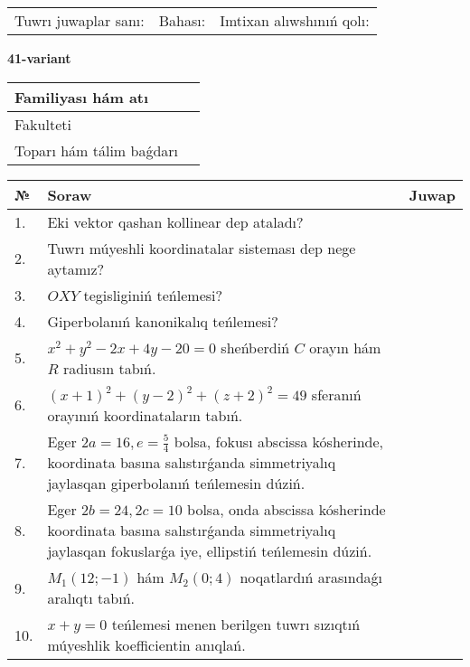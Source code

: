 \documentclass{article}
\begin{document}
\vspace{1cm}

\begin{tabular}{lll}
Tuwrı juwaplar sanı: \underline{\hspace{1.5cm}} & 
Bahası: \underline{\hspace{1.5cm}} & 
Imtixan alıwshınıń qolı: \underline{\hspace{2cm}} \\
\end{tabular}

\egroup

\newpage


\textbf{41-variant}\\

\bgroup
\def\arraystretch{1.6} %

\begin{tabular}{|m{5.7cm}|m{9.5cm}|}
\hline
Familiyası hám atı & \\
\hline
Fakulteti  & \\
\hline
Toparı hám tálim baǵdarı  & \\
\hline
\end{tabular}

\vspace{1cm}

\begin{tabular}{|m{0.7cm}|m{10cm}|m{4cm}|}
\hline
№ & Soraw & Juwap \\
\hline
1. & Eki vektor qashan kollinear dep ataladı? &  \\
\hline
2. & Tuwrı múyeshli koordinatalar sisteması dep nege aytamız? &  \\
\hline
3. & $OXY$ tegisliginiń teńlemesi? &  \\
\hline
4. & Giperbolanıń kanonikalıq teńlemesi? &  \\
\hline
5. & $x^{2}+y^{2}-2x+4y-20=0$ sheńberdiń $C$ orayın hám $R$ radiusın tabıń. &  \\
\hline
6. & $(x+1)^{2}+(y-2) ^{2}+(z+2) ^{2}=49$ sferanıń orayınıń koordinataların tabıń. &  \\
\hline
7. & Eger $2a=16, e=\frac{5}{4}$ bolsa, fokusı abscissa kósherinde, koordinata basına salıstırǵanda simmetriyalıq jaylasqan giperbolanıń teńlemesin dúziń. &  \\
\hline
8. & Eger $2b=24, 2 c=10$ bolsa, onda abscissa kósherinde koordinata basına salıstırǵanda simmetriyalıq jaylasqan fokuslarǵa iye, ellipstiń teńlemesin dúziń. &  \\
\hline
9. & $M_{1} (12;-1)$ hám $M_{2} (0;4)$ noqatlardıń arasındaǵı aralıqtı tabıń. &  \\
\hline
10. & $x+y=0$ teńlemesi menen berilgen tuwrı sızıqtıń múyeshlik koefficientin anıqlań. &  \\
\hline
\end{tabular}
\end{document}
